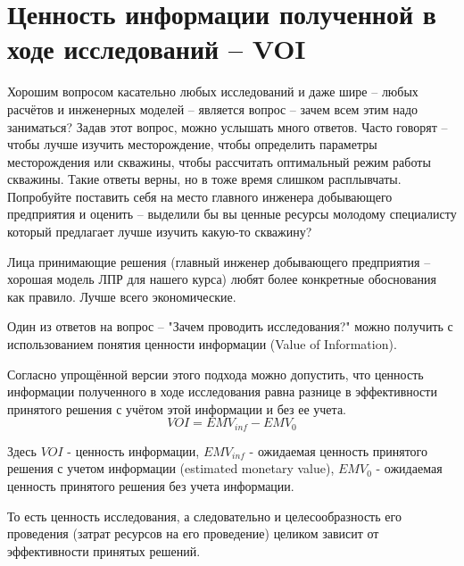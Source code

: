 \section{Ценность информации полученной в ходе исследований -- VOI}

Хорошим вопросом касательно любых исследований и даже шире -- любых расчётов и инженерных моделей -- является вопрос -- зачем всем этим надо заниматься? Задав этот вопрос, можно услышать много ответов. Часто говорят -- чтобы лучше изучить месторождение, чтобы определить параметры месторождения или скважины, чтобы рассчитать оптимальный режим работы скважины. Такие ответы верны, но в тоже время слишком расплывчаты. Попробуйте поставить себя на место главного инженера добывающего предприятия и оценить -- выделили бы вы ценные ресурсы молодому специалисту который предлагает лучше изучить какую-то скважину? 

Лица принимающие решения (главный инженер добывающего предприятия -- хорошая модель ЛПР для нашего курса) любят более конкретные обоснования как правило. Лучше всего экономические.

Один из ответов на вопрос -- "Зачем проводить исследования?" можно получить с использованием понятия ценности информации (Value of Information). 


Согласно упрощённой версии этого подхода можно допустить, что ценность информации полученного в ходе исследования равна разнице в эффективности принятого решения с учётом этой информации и без ее учета. 
$$VOI = EMV_{inf}-EMV_{0}$$

Здесь $VOI$ - ценность информации, $EMV_{inf}$ - ожидаемая ценность принятого решения с учетом информации (estimated monetary value), $EMV_{0}$ - ожидаемая ценность принятого решения без учета информации.

То есть ценность исследования, а следовательно и целесообразность его проведения (затрат ресурсов на его проведение) целиком зависит от эффективности принятых решений. 

